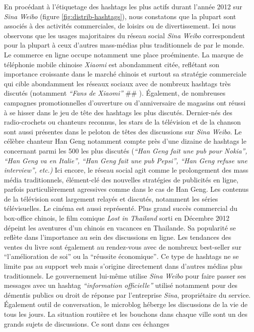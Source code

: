 En procédant à l{\textquoteright}étiquetage des hashtags les plus actifs durant l{\textquoteright}année 2012 sur \textit{Sina Weibo} (figure \ref{fig:distrib-hashtags}), nous constatons que la plupart sont associés à des activités commerciales, de loisirs ou de divertissement. Ici nous observons que les usages majoritaires du réseau social \textit{Sina Weibo} correspondent pour la plupart à ceux d{\textquoteright}autres mass-médias plus traditionnels de par le monde. Le commerce en ligne occupe notamment une place proéminente. La marque de téléphonie mobile chinoise \textit{Xiaomi} est abondamment citée, reflétant son importance croissante dans le marché chinois et surtout sa stratégie commerciale qui cible abondamment les réseaux sociaux avec de nombreux hashtags très discutés (notamment \textit{{\textquotedblleft}Fans de Xiaomi{\textquotedblright} } \#\# ). Également, de nombreuses campagnes promotionnelles d{\textquoteright}ouverture ou d{\textquoteright}anniversaire de magasins ont réussi à se hisser dans le jeu de t\^ete des hashtags les plus discutés. Dernier-nés des radio-crochets ou chanteurs reconnus, les stars de la télévision et de la chanson sont aussi présentes dans le peloton de t\^etes des discussions sur \textit{Sina Weibo}. Le célèbre chanteur Han Geng notamment compte près d{\textquoteright}une dizaine de hashtags le concernant parmi les 500 les plus discutés (\textit{{\textquotedblleft}Han Geng fait une pub pour Nokia{\textquotedblright}, {\textquotedblleft}Han Geng va en Italie{\textquotedblright}, {\textquotedblleft}Han Geng fait une pub Pepsi{\textquotedblright}, {\textquotedblleft}Han Geng refuse une interview{\textquotedblright}, etc.)} Ici encore, le réseau social agit comme le prolongement des mass média traditionnels, élément-clé des nouvelles stratégies de publicités en ligne, parfois particulièrement agressives comme dans le cas de Han Geng. Les contenus de la télévision sont largement relayés et discutés, notamment les séries télévisuelles. Le cinéma est aussi représenté. Plus grand succès commercial du box-office chinois, le film comique \textit{Lost in Thailand} sorti en Décembre 2012 dépeint les aventures d{\textquoteright}un chinois en vacances en Thailande. Sa popularité se reflète dans l{\textquoteright}importance au sein des discussions en ligne. Les tendances des ventes du livre sont également au rendez-vous avec de nombreux best-seller sur {\textquotedblleft}l{\textquoteright}amélioration de soi{\textquotedblright} ou la {\textquotedblleft}réussite économique{\textquotedblright}\textit{. }Ce type de hashtags ne se limite pas au support web mais s{\textquoteright}origine directement dans d{\textquoteright}autres médias plus traditionnels. Le gouvernement lui-m\^eme utilise \textit{Sina Weibo} pour faire passer ses messages avec un hashtag \textit{{\textquotedblleft}information officielle{\textquotedblright} }utilisé notamment pour des démentis publics ou droit de réponse par l{\textquoteright}entreprise \textit{Sina}, propriétaire du service. \'Egalement outil de conversation, le microblog héberge les discussions de la vie de tous les jours. La situation routière et les bouchons dans chaque ville sont un des grands sujets de discussions. Ce sont dans ces échanges 